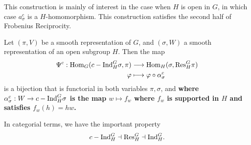 This construction is mainly of interest in the case when $H$ is open in $G$, in which case $a_\sigma^c$ is a $H$-homomorphism. This construction satisfies the second half of Frobenius Reciprocity.

\begin{thm}\label{thm:frob2}
	Let $(\pi,V)$ be a smooth representation of $G$, and $(\sigma,W)$ a smooth representation of an open subgroup $H$. Then the map 
	\begin{align*}
		\Psi^c:\mathrm{Hom}_G(c-\mathrm{Ind}_H^G \sigma, \pi)&\longrightarrow \mathrm{Hom}_H(\sigma, \mathrm{Res}_H^G\pi)\\
		\varphi &\longmapsto \varphi \circ \alpha^c_\sigma 
	\end{align*}
    is a bijection that is functorial in both variables $\pi,\sigma$, and \textbf{where $\alpha^c_\sigma: W\to c-\mathrm{Ind}_H^G \sigma$ is the map $w\mapsto f_w$ where $f_w$ is supported in $H$ and satisfies $f_w(h) = hw$.}
\end{thm}
In categorial terms, we have the important property
$$c-\mathrm{Ind}_H^G\dashv\mathrm{Res}_H^G\dashv\mathrm{Ind}_H^G.$$